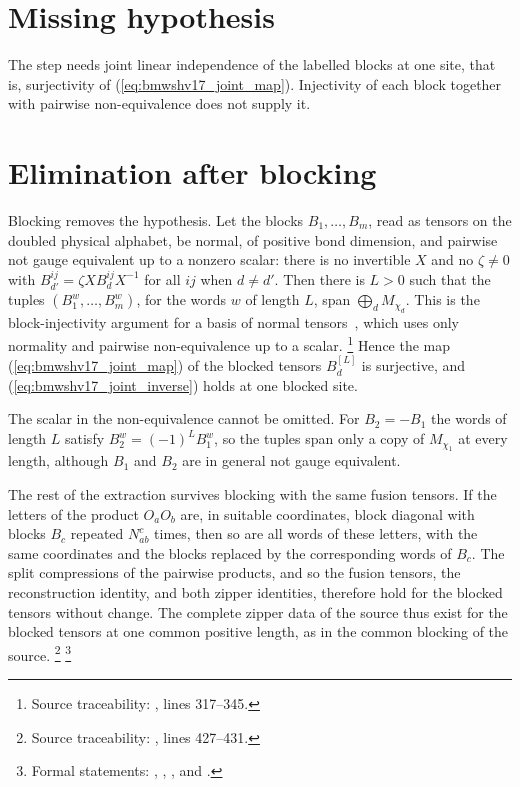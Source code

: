 \documentclass{article}
\begin{document}
\section{Missing hypothesis}
The step needs joint linear independence of the labelled blocks at one site,
that is, surjectivity of (\ref{eq:bmwshv17_joint_map}). Injectivity of each
block together with pairwise non-equivalence does not supply it.

\section{Elimination after blocking}
Blocking removes the hypothesis. Let the blocks $B_1,\ldots,B_m$, read as
tensors on the doubled physical alphabet, be normal, of positive bond
dimension, and pairwise not gauge equivalent up to a nonzero scalar: there is
no invertible $X$ and no $\zeta\ne0$ with $B_{d'}^{ij}=\zeta XB_d^{ij}X^{-1}$
for all $ij$ when $d\ne d'$. Then there is $L>0$ such that the tuples
$(B_1^w,\ldots,B_m^w)$, for the words $w$ of length $L$, span
$\bigoplus_dM_{\chi_d}$. This is the block-injectivity argument for a basis of
normal tensors~\cite{Cirac2016MPDO_arXiv}, which uses only normality and
pairwise non-equivalence up to a scalar.
\footnote{Source traceability: , lines 317--345.}
Hence the map (\ref{eq:bmwshv17_joint_map}) of the blocked tensors
$B_d^{[L]}$ is surjective, and (\ref{eq:bmwshv17_joint_inverse}) holds at one
blocked site.

The scalar in the non-equivalence cannot be omitted. For $B_2=-B_1$ the words
of length $L$ satisfy $B_2^w=(-1)^LB_1^w$, so the tuples span only a copy of
$M_{\chi_1}$ at every length, although $B_1$ and $B_2$ are in general not
gauge equivalent.

The rest of the extraction survives blocking with the same fusion tensors. If
the letters of the product $O_aO_b$ are, in suitable coordinates, block
diagonal with blocks $B_c$ repeated $N_{ab}^c$ times, then so are all words of
these letters, with the same coordinates and the blocks replaced by the
corresponding words of $B_c$. The split compressions of the pairwise products,
and so the fusion tensors, the reconstruction identity, and both zipper
identities, therefore hold for the blocked tensors without change. The
complete zipper data of the source thus exist for the blocked tensors at one
common positive length, as in the common blocking of the source.
\footnote{Source traceability: ,
    lines 427--431.}
\footnote{Formal statements:
    ,
    ,
    , and
    .}
\end{document}
